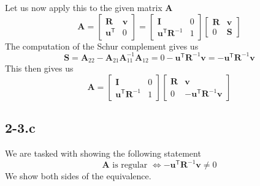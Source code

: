 \documentclass{article}
\begin{document}
\noindent Let us now apply this to the given matrix $\mathbf{A}$
\begin{equation*}
    \mathbf{A} = 
    \begin{bmatrix}
    \mathbf{R} & \mathbf{v} \\
    \mathbf{u}^{\mathsf{T}} & 0
    \end{bmatrix} = 
    \begin{bmatrix}
        \mathbf{I} & 0 \\
        \mathbf{u}^{\mathsf{T}}\mathbf{R}^{-1} & 1
    \end{bmatrix}
    \begin{bmatrix}
        \mathbf{R} & \mathbf{v} \\
        0 & \mathbf{S}
    \end{bmatrix}
\end{equation*}
The computation of the Schur complement gives us
\begin{equation*}
    \mathbf{S} = \mathbf{A}_{22} - \mathbf{A}_{21}\mathbf{A}_{11}^{-1}\mathbf{A}_{12} = 0 - \mathbf{u}^{\mathsf{T}}\mathbf{R}^{-1}\mathbf{v} =  - \mathbf{u}^{\mathsf{T}}\mathbf{R}^{-1}\mathbf{v}
\end{equation*}
This then gives us 
\begin{equation*}
     \mathbf{A} = \begin{bmatrix}
        \mathbf{I} & 0 \\
        \mathbf{u}^{\mathsf{T}}\mathbf{R}^{-1} & 1
    \end{bmatrix}
    \begin{bmatrix}
        \mathbf{R} & \mathbf{v} \\
        0 &  - \mathbf{u}^{\mathsf{T}}\mathbf{R}^{-1}\mathbf{v}
    \end{bmatrix}
\end{equation*}
\subsection*{2-3.c}
We are tasked with showing the following statement
\begin{equation*}
    \mathbf{A} \text{ is regular } \Longleftrightarrow - \mathbf{u}^{\mathsf{T}}\mathbf{R}^{-1}\mathbf{v} \neq 0
\end{equation*}
We show both sides of the equivalence. 
\end{document}
